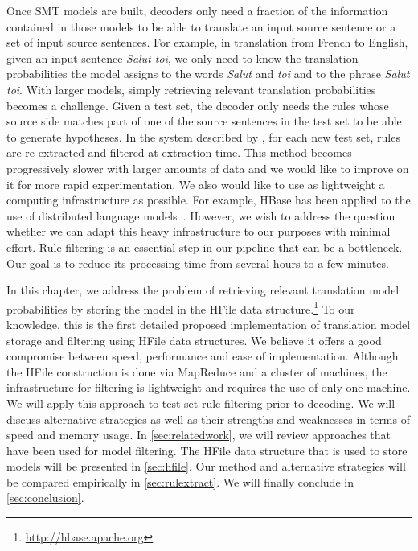 Once SMT models are built, decoders only need a fraction of the information
contained in those models to be able to translate an input source sentence or a
set of input source sentences. For example, in translation from French to
English, given an input sentence \emph{Salut toi}, we only need to know the
translation probabilities the model assigns to the words \emph{Salut} and
\emph{toi} and to the phrase \emph{Salut toi}.
With larger models, simply retrieving relevant translation
probabilities becomes a challenge. Given a test set, the decoder
only needs the rules whose source side matches part of one of the source
sentences in the test set to be able to generate hypotheses. In the system
described by \citet{iglesias-degispert-banga-byrne:2009:NAACL}, for each
new test set, rules are re-extracted and filtered at extraction time. This
method becomes progressively slower with larger amounts of data and we
would like to improve on it for more rapid experimentation. We also would like
to use as lightweight a computing infrastructure as possible. For example, HBase
has been applied to the use of distributed language
models~\citep{yu:2008:mastersthesis}. However, we wish to address the question
whether we can adapt this heavy infrastructure to our purposes with minimal
effort. Rule filtering is an essential step in our pipeline that can be a
bottleneck. Our goal is to reduce its processing time from several hours to a
few minutes.

In this chapter, we address the problem of retrieving relevant translation
model probabilities by storing the model in the HFile data
structure.\footnote{\url{http://hbase.apache.org}} To our knowledge, this is the first
detailed proposed implementation of translation model storage and
filtering using HFile data structures. We believe it offers a good compromise
between speed, performance and ease of implementation. Although the HFile
construction is done via MapReduce and a cluster of machines, the infrastructure
for filtering is lightweight and requires the use of only one machine. We will
apply this approach to test set rule filtering prior
to decoding. We will discuss alternative
strategies as well as their strengths and weaknesses in terms of speed and
memory usage. In \autoref{sec:relatedwork}, we will review approaches that
have been used for model filtering. The HFile data structure that is used to
store models will be presented in \autoref{sec:hfile}. Our method and
alternative strategies will be compared empirically in
\autoref{sec:rulextract}. We will finally conclude in \autoref{sec:conclusion}.

